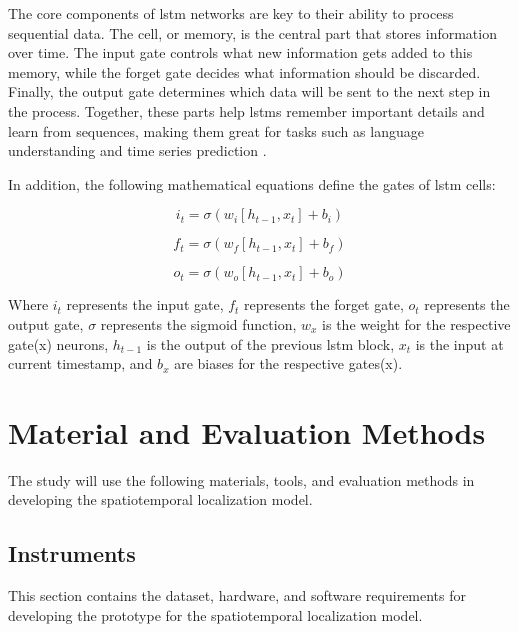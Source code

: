 \begin{refsection}
The core components of \gls{lstm} networks are key to their ability to process sequential data. The cell, or memory, is the central part that stores information over time. The input gate controls what new information gets added to this memory, while the forget gate decides what information should be discarded. Finally, the output gate determines which data will be sent to the next step in the process. Together, these parts help \gls{lstm}s remember important details and learn from sequences, making them great for tasks such as language understanding and time series prediction \cite{10.1162/neco.1997.9.1.1}.

In addition, the following mathematical equations define the gates of \gls{lstm} cells:

\begin{equation}
i_t = \sigma(w_i[h_{t-1}, x_t] + b_i)
\label{eq:igatelstm}
\end{equation}

\begin{equation}
f_t = \sigma(w_f[h_{t-1}, x_t] + b_f)
\label{eq:fgatelstm}
\end{equation}

\begin{equation}
o_t = \sigma(w_o[h_{t-1}, x_t] + b_o)
\label{eq:ogatelstm}
\end{equation}

Where \(i_t\) represents the input gate, \(f_t\) represents the forget gate, \(o_t\) represents the output gate, \(\sigma\) represents the sigmoid function, \(w_x\) is the weight for the respective gate(x) neurons, \(h_{t-1}\) is the output of the previous \gls{lstm} block, \(x_t\) is the input at current timestamp, and \(b_x\) are biases for the respective gates(x).

\section{Material and Evaluation Methods}

The study will use the following materials, tools, and evaluation methods in developing the spatiotemporal localization model.

\subsection{Instruments}

This section contains the dataset, hardware, and software requirements for developing the prototype for the spatiotemporal localization model.


\end{refsection}
